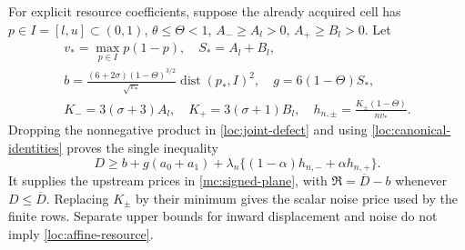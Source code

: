 \documentclass[aop,preprint]{imsart}
\theoremstyle{definition}
\numberwithin{equation}{section}
\begin{document}
For explicit resource coefficients, suppose the already acquired cell
has $p\in I=[l,u]\subset(0,1)$, $\theta\le\Theta<1$,
$A_-\ge A_l>0$, $A_+\ge B_l>0$. Let
\begin{gather*}
 v_* =\max_{p\in I}p(1-p),\quad S_*=A_l+B_l,\\
 b=\frac{(6+2\sigma)(1-\Theta)^{3/2}}{\sqrt{v_*}}
                      \operatorname{dist}(p_*,I)^2,\quad
 g=6(1-\Theta)S_*,\\
 K_-=3(\sigma+3)A_l,\quad K_+=3(\sigma+1)B_l,\quad
 h_{n,\pm}=\frac{K_\pm(1-\Theta)}{nv_*}.
\end{gather*}
Dropping the nonnegative product in \eqref{loc:joint-defect} and
using \eqref{loc:canonical-identities} proves the single inequality
\begin{equation}\label{loc:affine-resource}
 D\ge b+g(a_0+a_1)
       +\lambda_n\{(1-\alpha)h_{n,-}+\alpha h_{n,+}\}.
\end{equation}
It supplies the upstream prices in \eqref{mc:signed-plane}, with
$\mathfrak R=\overline D-b$ whenever
$D\le\overline D$. Replacing $K_\pm$ by their minimum gives the
scalar noise price used by the finite rows. Separate upper bounds for
inward displacement and noise do not imply \eqref{loc:affine-resource}.
\end{document}

